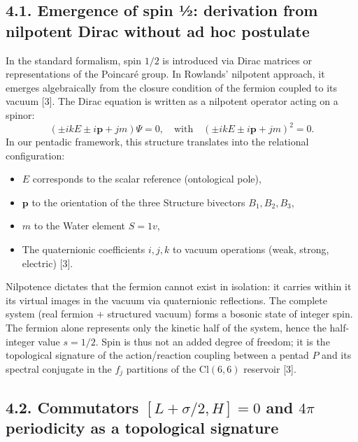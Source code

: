 \documentclass[11pt]{article}
\providecommand{\tightlist}{\setlength{\itemsep}{2pt}\setlength{\parskip}{6pt}}
\providecommand{\tightlist}{%
  \setlength{\itemsep}{2pt}\setlength{\parskip}{6pt}
}
\begin{document}
\hypertarget{emergence-of-spin-uxbd-derivation-from-nilpotent-dirac-without-ad-hoc-postulate}{%
\subsection{4.1. Emergence of spin ½: derivation from nilpotent Dirac
without ad hoc
postulate}\label{emergence-of-spin-uxbd-derivation-from-nilpotent-dirac-without-ad-hoc-postulate}}

In the standard formalism, spin \(1/2\) is introduced via Dirac matrices
or representations of the Poincaré group. In Rowlands' nilpotent
approach, it emerges algebraically from the closure condition of the
fermion coupled to its vacuum {[}3{]}. The Dirac equation is written as
a nilpotent operator acting on a spinor: \[
(\pm i k E \pm i \mathbf{p} + j m) \Psi = 0, \quad \text{with} \quad (\pm i k E \pm i \mathbf{p} + j m)^2 = 0.
\] In our pentadic framework, this structure translates into the
relational configuration:

\begin{itemize}
\tightlist
\item
  \(E\) corresponds to the scalar reference (ontological pole),
\item
  \(\mathbf{p}\) to the orientation of the three Structure bivectors
  \({B_1, B_2, B_3}\),
\item
  \(m\) to the Water element \(S = 1v\),
\item
  The quaternionic coefficients \({i, j, k}\) to vacuum operations
  (weak, strong, electric) {[}3{]}.
\end{itemize}

Nilpotence dictates that the fermion cannot exist in isolation: it
carries within it its virtual images in the vacuum via quaternionic
reflections. The complete system (real fermion + structured vacuum)
forms a bosonic state of integer spin. The fermion alone represents only
the kinetic half of the system, hence the half-integer value
\(s = 1/2\). Spin is thus not an added degree of freedom; it is the
topological signature of the action/reaction coupling between a pentad
\(P\) and its spectral conjugate in the \(f_j\) partitions of the
\(\text{Cl}(6,6)\) reservoir {[}3{]}.

\hypertarget{commutators-l-sigma2-h-0-and-4pi-periodicity-as-a-topological-signature}{%
\subsection{\texorpdfstring{4.2. Commutators \([L + \sigma/2, H] = 0\)
and \(4\pi\) periodicity as a topological
signature}{4.2. Commutators {[}L + \textbackslash sigma/2, H{]} = 0 and 4\textbackslash pi periodicity as a topological signature}}\label{commutators-l-sigma2-h-0-and-4pi-periodicity-as-a-topological-signature}}
\end{document}
